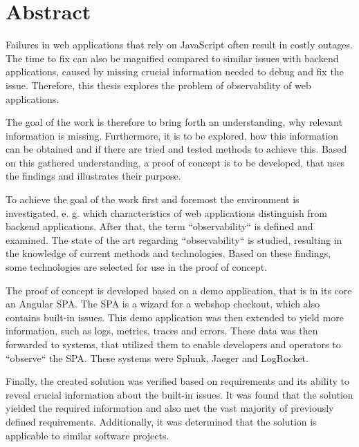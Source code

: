 \newpage{}

\section*{\thispagestyle{empty}Abstract}

Failures in web applications that rely on JavaScript often result in costly outages. The time to fix can also be magnified compared to similar issues with backend applications, caused by missing crucial information needed to debug and fix the issue. Therefore, this thesis explores the problem of observability of web applications.

The goal of the work is therefore to bring forth an understanding, why relevant information is missing. Furthermore, it is to be explored, how this information can be obtained and if there are tried and tested methods to achieve this. Based on this gathered understanding, a proof of concept is to be developed, that uses the findings and illustrates their purpose.

To achieve the goal of the work first and foremost the environment is investigated, e. g. which characteristics of web applications distinguish from backend applications. After that, the term ``observability`` is defined and examined. The state of the art regarding ``observability`` is studied, resulting in the knowledge of current methods and technologies. Based on these findings, some technologies are selected for use in the proof of concept.

The proof of concept is developed based on a demo application, that is in its core an Angular SPA. The SPA is a wizard for a webshop checkout, which also contains built-in issues. This demo application was then extended to yield more information, such as logs, metrics, traces and errors. These data was then forwarded to systems, that utilized them to enable developers and operators to ``observe`` the SPA. These systems were Splunk, Jaeger and LogRocket.

Finally, the created solution was verified based on requirements and its ability to reveal crucial information about the built-in issues. It was found that the solution yielded the required information and also met the vast majority of previously defined requirements. Additionally, it was determined that the solution is applicable to similar software projects.